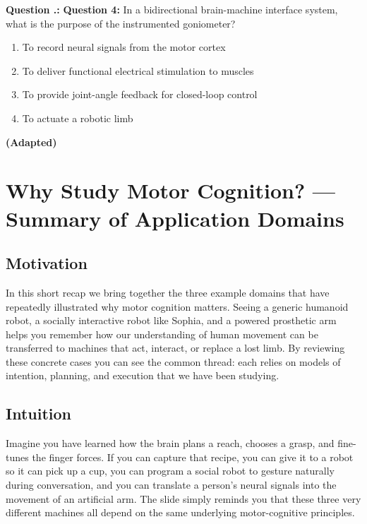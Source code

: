 \documentclass[12pt, a4paper]{article}
\newcounter{question}[section]
\renewcommand{\thequestion}{\thesection.\arabic{question}}
\newenvironment{question}
  {\refstepcounter{question}\par\noindent\textbf{Question \thequestion:}}
  {\par}
\begin{document}
\newpage

\begin{question}
\textbf{Question 4:} In a bidirectional brain-machine interface system, what is the purpose of the instrumented goniometer?
    \begin{enumerate}[label=\Alph)]
        \item To record neural signals from the motor cortex
        \item To deliver functional electrical stimulation to muscles
        \item To provide joint-angle feedback for closed-loop control
        \item To actuate a robotic limb
    \end{enumerate}
\textbf{(Adapted)}
\end{question}

\newpage

\section{Why Study Motor Cognition? --- Summary of Application Domains}

\subsection{Motivation}
In this short recap we bring together the three example domains that have repeatedly illustrated why motor cognition matters.  
Seeing a generic humanoid robot, a socially interactive robot like Sophia, and a powered prosthetic arm helps you remember how our understanding of human movement can be transferred to machines that act, interact, or replace a lost limb.  
By reviewing these concrete cases you can see the common thread: each relies on models of intention, planning, and execution that we have been studying.

\subsection{Intuition}
Imagine you have learned how the brain plans a reach, chooses a grasp, and fine-tunes the finger forces.  
If you can capture that recipe, you can give it to a robot so it can pick up a cup, you can program a social robot to gesture naturally during conversation, and you can translate a person's neural signals into the movement of an artificial arm.  
The slide simply reminds you that these three very different machines all depend on the same underlying motor-cognitive principles.
\end{document}
